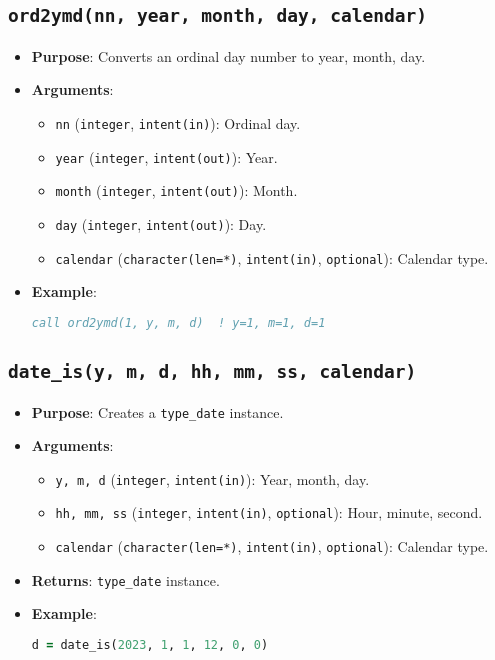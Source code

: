 \documentclass[12pt,a4paper]{report}
\begin{document}
\subsection{\texttt{ord2ymd(nn, year, month, day, calendar)}}
\begin{itemize}
\item \textbf{Purpose}: Converts an ordinal day number to year, month, day.
\item \textbf{Arguments}:
\begin{itemize}
\item \texttt{nn} (\texttt{integer}, \texttt{intent(in)}): Ordinal day.
\item \texttt{year} (\texttt{integer}, \texttt{intent(out)}): Year.
\item \texttt{month} (\texttt{integer}, \texttt{intent(out)}): Month.
\item \texttt{day} (\texttt{integer}, \texttt{intent(out)}): Day.
\item \texttt{calendar} (\texttt{character(len=*)}, \texttt{intent(in)}, \texttt{optional}): Calendar type.
\end{itemize}
\item \textbf{Example}:
\begin{lstlisting}[language=Fortran]
call ord2ymd(1, y, m, d)  ! y=1, m=1, d=1
\end{lstlisting}
\end{itemize}

\subsection{\texttt{date\_is(y, m, d, hh, mm, ss, calendar)}}
\begin{itemize}
\item \textbf{Purpose}: Creates a \texttt{type\_date} instance.
\item \textbf{Arguments}:
\begin{itemize}
\item \texttt{y, m, d} (\texttt{integer}, \texttt{intent(in)}): Year, month, day.
\item \texttt{hh, mm, ss} (\texttt{integer}, \texttt{intent(in)}, \texttt{optional}): Hour, minute, second.
\item \texttt{calendar} (\texttt{character(len=*)}, \texttt{intent(in)}, \texttt{optional}): Calendar type.
\end{itemize}
\item \textbf{Returns}: \texttt{type\_date} instance.
\item \textbf{Example}:
\begin{lstlisting}[language=Fortran]
d = date_is(2023, 1, 1, 12, 0, 0)
\end{lstlisting}
\end{itemize}
\end{document}
